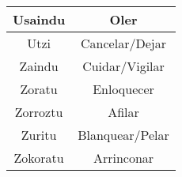 \documentclass[11pt, a4paper]{article}
\begin{document}
\begin{longtable}{cc}
\hline
Usaindu                    & Oler                        \\ 
\hline
Utzi                       & Cancelar/Dejar              \\ 
\hline
Zaindu                     & Cuidar/Vigilar              \\ 
\hline
Zoratu                     & Enloquecer                  \\ 
\hline
Zorroztu                   & Afilar                      \\ 
\hline
Zuritu                     & Blanquear/Pelar             \\ 
\hline
Zokoratu                   & Arrinconar                  \\
\hline
\end{longtable}
\end{document}
